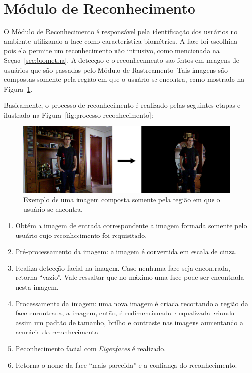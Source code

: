 \section{Módulo de Reconhecimento}

	O Módulo de Reconhecimento é responsável pela identificação dos usuários no ambiente utilizando a face como característica biométrica. A face foi escolhida pois ela permite um reconhecimento não intrusivo, como mencionada na Seção~\ref{sec:biometria}. A detecção e o reconhecimento são feitos em imagens de usuários que são passadas pelo Módulo de Rastreamento. Tais imagens são compostas somente pela região em que o usuário se encontra, como mostrado na Figura~\ref{fig:users-img}.

	Basicamente, o processo de reconhecimento é realizado pelas seguintes etapas e ilustrado na Figura~\ref{fig:processo-reconhecimento}:

		\begin{figure}[htb]
			\begin{center}
				\includegraphics[scale=0.3]{figuras/4.ProblemaEProposta/users-img.png}
			\end{center}
			\caption{Exemplo de uma imagem composta somente pela região em que o usuário se encontra.}
			\label{fig:users-img}
		\end{figure}

		\begin{enumerate}
			\item Obtém a imagem de entrada correspondente a imagem formada somente pelo usuário cujo reconhecimento foi requisitado.
			\item Pré-processamento da imagem: a imagem é convertida em escala de cinza.
			\item Realiza detecção facial na imagem. Caso nenhuma face seja encontrada, retorna ``vazio''. Vale ressaltar que no máximo uma face pode ser encontrada nesta imagem.
			\item Processamento da imagem: uma nova imagem é criada recortando a região da face encontrada, a imagem, então, é redimensionada e equalizada criando assim um padrão de tamanho, brilho e contraste nas imagens aumentando a acurácia do reconhecimento.
			\item Reconhecimento facial com \textit{Eigenfaces} é realizado.
			\item Retorna o nome da face ``mais parecida'' e a confiança do reconhecimento.
		\end{enumerate}

